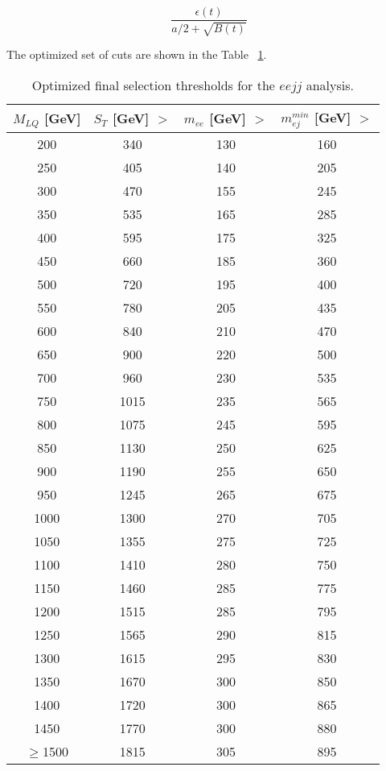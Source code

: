   \begin{equation}
    \frac{\epsilon(t)}{a/2+\sqrt{B(t)}}
    \label{eq:punziOpt}
  \end{equation}

The optimized set of cuts are shown in the Table ~\ref{tab:optimizedThresholds}.
\begin{table}[h]
  \begin{center}
    \caption{Optimized final selection thresholds for the $eejj$ analysis.}
    \label{tab:optimizedThresholds}
    \begin{tabular}{|c||c|c|c|}\hline
      $M_{LQ}$ [GeV]     &     $S_T$ [GeV] $ >$       &      $m_{ee}$ [GeV] $ >$     &     $m_{ej}^{min}$ [GeV] $ >$ \\ \hline\hline
      200 & 340 & 130 & 160 \\ 
      \hline 
      250 & 405 & 140 & 205 \\ 
      \hline 
      300 & 470 & 155 & 245 \\ 
      \hline 
      350 & 535 & 165 & 285 \\ 
      \hline 
      400 & 595 & 175 & 325 \\ 
      \hline 
      450 & 660 & 185 & 360 \\ 
      \hline 
      500 & 720 & 195 & 400 \\ 
      \hline 
      550 & 780 & 205 & 435 \\ 
      \hline 
      600 & 840 & 210 & 470 \\ 
      \hline 
      650 & 900 & 220 & 500 \\ 
      \hline 
      700 & 960 & 230 & 535 \\ 
      \hline 
      750 & 1015 & 235 & 565 \\ 
      \hline 
      800 & 1075 & 245 & 595 \\ 
      \hline 
      850 & 1130 & 250 & 625 \\ 
      \hline 
      900 & 1190 & 255 & 650 \\ 
      \hline 
      950 & 1245 & 265 & 675 \\ 
      \hline 
      1000 & 1300 & 270 & 705 \\ 
      \hline 
      1050 & 1355 & 275 & 725 \\ 
      \hline 
      1100 & 1410 & 280 & 750 \\ 
      \hline 
      1150 & 1460 & 285 & 775 \\ 
      \hline 
      1200 & 1515 & 285 & 795 \\ 
      \hline 
      1250 & 1565 & 290 & 815 \\ 
      \hline 
      1300 & 1615 & 295 & 830 \\ 
      \hline 
      1350 & 1670 & 300 & 850 \\ 
      \hline 
      1400 & 1720 & 300 & 865 \\ 
      \hline 
      1450 & 1770 & 300 & 880 \\ 
      \hline 
      $\geq$1500 & 1815 & 305 & 895 \\ 
      \hline 
    \end{tabular}


\end{center}
\end{table}
